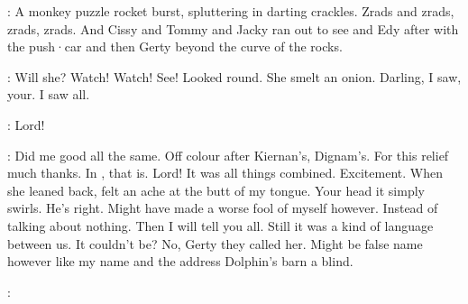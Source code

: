 :
A monkey puzzle rocket burst,
spluttering in darting crackles.
Zrads
and zrads,
zrads,
zrads.
And Cissy and Tommy and Jacky ran out to see
and Edy after with the push·car and then Gerty beyond the curve of the
rocks.

\Bloom:
Will she?
Watch!
Watch!
See!
Looked round.
She smelt an onion.
Darling,
I saw,
your.
I saw all.

\Bloom:
Lord!

\Bloom:
Did me good all the same.
Off colour after Kiernan's,
Dignam's.
For
this relief much thanks.
In ,
that is.
Lord!
It was all things
combined.
Excitement.
When she leaned back,
felt an ache at the butt of my
tongue.
Your head it simply swirls.
He's right.
Might have made a worse
fool of myself however.
Instead of talking about nothing.
Then I will tell
you all.
Still it was a kind of language between us.
It couldn't be?
No,
Gerty they called her.
Might be false name however like my name and the
address Dolphin's barn a blind.

:

